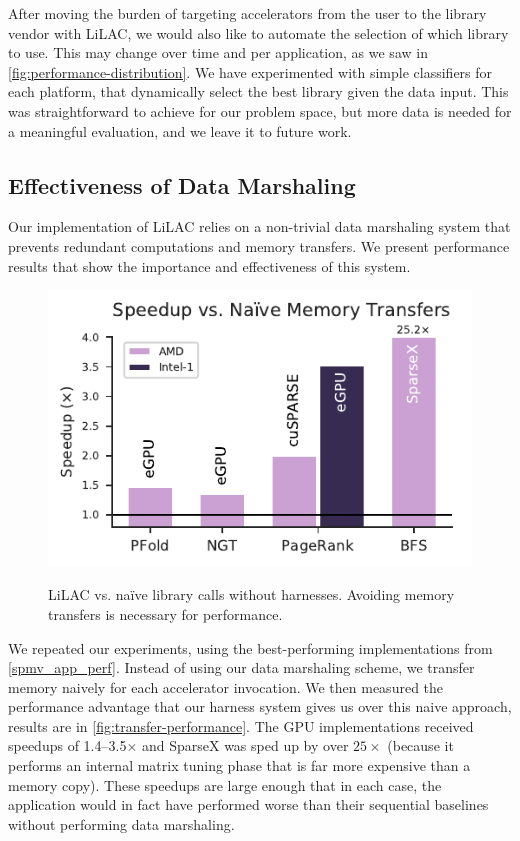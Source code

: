 After moving the burden of targeting accelerators from the user to the
library vendor with LiLAC, we would also like to automate the selection of which
library to use.
This may change over time and per application, as we saw in
\autoref{fig:performance-distribution}.
We have experimented with simple classifiers for each platform, that dynamically
select the best library given the data input.
This was straightforward to achieve for our problem space, but more data is
needed for a meaningful evaluation, and we leave it to future work.

\subsection{Effectiveness of Data Marshaling}
Our implementation of LiLAC relies on a non-trivial data marshaling system that
prevents redundant computations and memory transfers. We present performance
results that show the importance and effectiveness of this system.

\begin{figure}[t]
  \centering
  \includegraphics[width=\columnwidth,height=0.67\columnwidth]{figures/marshall.pdf}
\\[-0.75em]
  \caption{LiLAC vs. na\"ive library calls without harnesses.
           Avoiding memory transfers is necessary for performance.}
  \label{fig:transfer-performance}
\end{figure}

We repeated our experiments, using the best-performing implementations from
\autoref{spmv_app_perf}.
Instead of using our data marshaling scheme, we transfer memory naively for
each accelerator invocation.
We then measured the performance advantage that our harness system gives us over
this naive approach, results are in \autoref{fig:transfer-performance}.
The GPU implementations received speedups of 1.4--3.5$\times$ and SparseX was
sped up by over $25\times$ (because it performs an internal matrix tuning phase
that is far more expensive than a memory copy).
These speedups are large enough that in each case, the application would in fact
have performed worse than their sequential baselines without performing data
marshaling.


